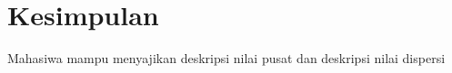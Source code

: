 \documentclass[a4paper,12pt]{article}
\begin{document}
\newpage

\section{Kesimpulan}
Mahasiwa mampu menyajikan deskripsi nilai pusat dan deskripsi nilai dispersi
\end{document}
